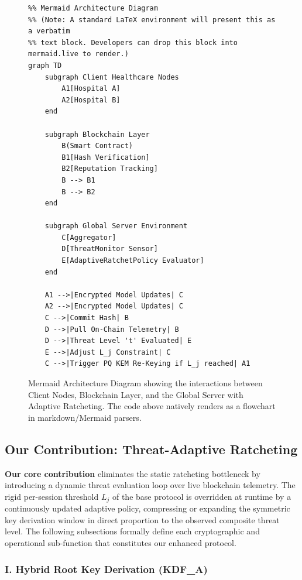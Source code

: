 \documentclass[journal, 10pt, twocolumn]{IEEEtran}
\begin{document}
\begin{figure}[htbp]
\centering
\begin{verbatim}
%% Mermaid Architecture Diagram
%% (Note: A standard LaTeX environment will present this as a verbatim 
%% text block. Developers can drop this block into mermaid.live to render.)
graph TD
    subgraph Client Healthcare Nodes
        A1[Hospital A]
        A2[Hospital B]
    end
    
    subgraph Blockchain Layer
        B(Smart Contract)
        B1[Hash Verification]
        B2[Reputation Tracking]
        B --> B1
        B --> B2
    end
    
    subgraph Global Server Environment
        C[Aggregator]
        D[ThreatMonitor Sensor]
        E[AdaptiveRatchetPolicy Evaluator]
    end

    A1 -->|Encrypted Model Updates| C
    A2 -->|Encrypted Model Updates| C
    C -->|Commit Hash| B
    D -->|Pull On-Chain Telemetry| B
    D -->|Threat Level 't' Evaluated| E
    E -->|Adjust L_j Constraint| C
    C -->|Trigger PQ KEM Re-Keying if L_j reached| A1
\end{verbatim}
\vspace{0.2cm}
\caption{Mermaid Architecture Diagram showing the interactions between Client Nodes, Blockchain Layer, and the Global Server with Adaptive Ratcheting. The code above natively renders as a flowchart in markdown/Mermaid parsers.}
\label{fig:mermaid_arch}
\end{figure}

\subsection{Our Contribution: Threat-Adaptive Ratcheting}
\label{sec:contribution_adaptive}

\textbf{Our core contribution} eliminates the static ratcheting bottleneck by introducing a dynamic threat evaluation loop over live blockchain telemetry. The rigid per-session threshold $L_j$ of the base protocol is overridden at runtime by a continuously updated adaptive policy, compressing or expanding the symmetric key derivation window in direct proportion to the observed composite threat level. The following subsections formally define each cryptographic and operational sub-function that constitutes our enhanced protocol.

\subsubsection{I. Hybrid Root Key Derivation (KDF\_A)}
\end{document}
